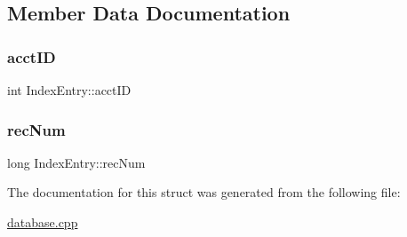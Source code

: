 \subsection{Member Data Documentation}
\hypertarget{struct_index_entry_aa5008695f70f365c7959d42ccca0fa13}{}\label{struct_index_entry_aa5008695f70f365c7959d42ccca0fa13} 
\subsubsection{\texorpdfstring{acct\+ID}{acctID}}
{\footnotesize\ttfamily int Index\+Entry\+::acct\+ID}

\hypertarget{struct_index_entry_a3f71077b699f2d718ca60df893c4c470}{}\label{struct_index_entry_a3f71077b699f2d718ca60df893c4c470} 
\subsubsection{\texorpdfstring{rec\+Num}{recNum}}
{\footnotesize\ttfamily long Index\+Entry\+::rec\+Num}



The documentation for this struct was generated from the following file\+:\begin{DoxyCompactItemize}
\item 
\hyperlink{database_8cpp}{database.\+cpp}\end{DoxyCompactItemize}
